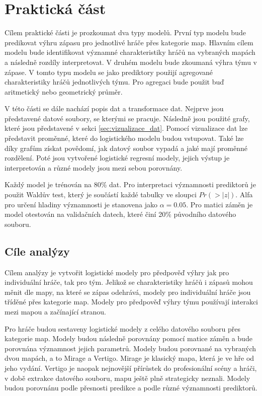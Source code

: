\chapter{Praktická část}
Cílem praktické části je prozkoumat dva typy modelů. První typ modelu bude predikovat výhru zápasu pro jednotlivé hráče přes kategorie map. Hlavním cílem 
modelu bude identifikovat významné charakteristiky hráčů na vybraných mapách a následně rozdíly interpretovat. V druhém modelu bude zkoumaná výhra týmu v zápase.
V tomto typu modelu se jako prediktory použijí agregované charakteristiky hráčů jednotlivých týmu. Pro agregaci bude použit buď aritmetický nebo geometrický průměr. 

V této části se dále nachází popis dat a transformace dat. Nejprve jsou představené datové soubory,
se kterými se pracuje. Následně jsou použité grafy, které jsou představené v sekci \ref{sec:vizualizace_dat}. Pomocí vizualizace dat lze představit proměnné, které
do logistického modelu budou vstupovat. Také lze díky grafům získat povědomí, jak datový soubor vypadá a jaké mají proměnné rozdělení.
Poté jsou vytvořené logistické regresní modely, jejich výstup je interpretován a různé modely jsou mezi sebou porovnány.

Každý model je trénován na 80\% dat. Pro interpretaci významnosti prediktorů je použit Waldův test, který je součástí každé tabulky
ve sloupci $Pr(>|z|)$. Alfa pro určení hladiny významnosti je stanovena jako $\alpha = 0.05$. Pro matici záměn je model otestován na validačních datech, 
které činí 20\% původního datového souboru.


\section{Cíle analýzy}
Cílem analýzy je vytvořit logistické modely pro předpověď výhry jak pro individuální hráče, tak pro tým. Jelikož se charakteristiky hráčů i zápasů mohou měnit dle mapy,
na které se zápas odehrává, modely pro individuální hráče jsou tříděné přes kategorie map. Modely pro předpověď výhry týmu používají interakci mezi mapou a začínající
stranou.

Pro hráče budou sestaveny logistické modely z celého datového souboru přes kategorie map. Modely budou následně porovnány pomocí matice záměn
a bude porovnána významnost jejich parametrů. Modely budou porovnané na vybraných dvou mapách, a to Mirage a Vertigo. Mirage je klasický mapa, která je
ve hře od jeho vydání. Vertigo je naopak nejnovější přírůstek do profesionální scény a hráči, v době extrakce datového souboru, mapu ještě plně strategicky 
neznali. Modely budou porovnánu podle přesnosti predikce a podle různé významnosti prediktorů.

